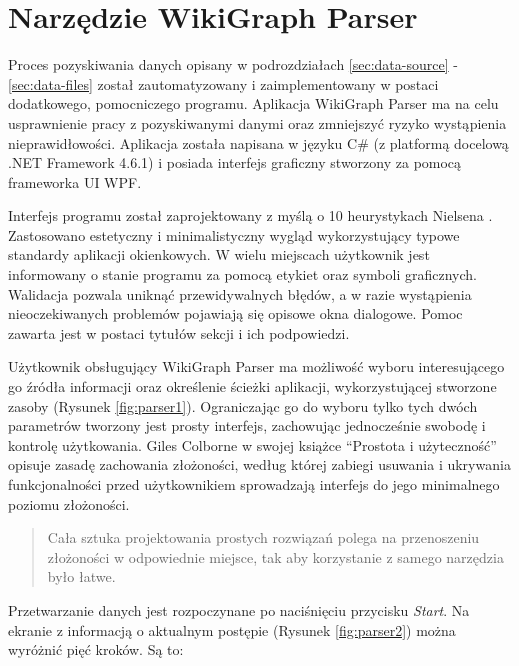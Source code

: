 \section{Narzędzie WikiGraph Parser}
\label{sec:parser-tool}
Proces pozyskiwania danych opisany w podrozdziałach \ref{sec:data-source} - \ref{sec:data-files} został zautomatyzowany i zaimplementowany w postaci dodatkowego, pomocniczego programu. Aplikacja WikiGraph Parser ma na celu usprawnienie pracy z pozyskiwanymi danymi oraz zmniejszyć ryzyko wystąpienia nieprawidłowości. Aplikacja została napisana w języku C\# (z platformą docelową .NET Framework 4.6.1) i posiada interfejs graficzny stworzony za pomocą frameworka UI WPF.

Interfejs programu został zaprojektowany z myślą o 10 heurystykach Nielsena \cite{Heuristics}. Zastosowano estetyczny i minimalistyczny wygląd wykorzystujący typowe standardy aplikacji okienkowych. W wielu miejscach użytkownik jest informowany o stanie programu za pomocą etykiet oraz symboli graficznych. Walidacja pozwala uniknąć przewidywalnych błędów, a w razie wystąpienia nieoczekiwanych problemów pojawiają się opisowe okna dialogowe. Pomoc zawarta jest w postaci tytułów sekcji i ich podpowiedzi.


Użytkownik obsługujący WikiGraph Parser ma możliwość wyboru interesującego go źródła informacji oraz określenie ścieżki aplikacji, wykorzystującej stworzone zasoby (Rysunek \ref{fig:parser1}). Ograniczając go do wyboru tylko tych dwóch parametrów tworzony jest prosty interfejs, zachowując jednocześnie swobodę i kontrolę użytkowania. Giles Colborne w swojej książce ``Prostota i użyteczność'' \cite{ProstotaUzytecznosc} opisuje zasadę zachowania złożoności, według której zabiegi usuwania i ukrywania funkcjonalności przed użytkownikiem sprowadzają interfejs do jego minimalnego poziomu złożoności.

\begin{center}
	\hyphenblockcquote{polish}{ProstotaUzytecznosc}{
        Cała sztuka projektowania prostych rozwiązań polega na przenoszeniu złożoności w odpowiednie miejsce, tak aby korzystanie z samego narzędzia było łatwe.
	}
\end{center}


Przetwarzanie danych jest rozpoczynane po naciśnięciu przycisku \textit{Start}. Na ekranie z informacją o aktualnym postępie (Rysunek \ref{fig:parser2}) można wyróżnić pięć kroków. Są to:

